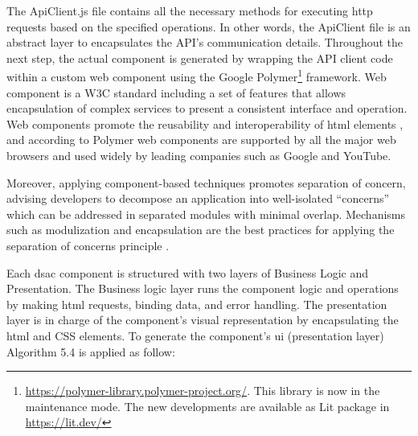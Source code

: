 The ApiClient.js file contains all the necessary methods for executing
\gls{http} requests based on the specified operations. In other words, the
ApiClient file is an abstract layer to encapsulates the API's
communication details. Throughout the next step, the actual component is
generated by wrapping the API client code within a custom web component
using the Google Polymer\footnote{\url{https://polymer-library.polymer-project.org/}.
  This library is now in the maintenance mode. The new developments are
  available as Lit package in \url{https://lit.dev/}} framework. Web
component is a W3C standard including a set of features that allows
encapsulation of complex services to present a consistent interface and
operation. Web components promote the reusability and interoperability
of \gls{html} elements \autocite{Yang2002a}, and according to \autocite{Rojas2021} Polymer web components are supported by all the major web browsers
and used widely by leading companies such as Google and YouTube.

Moreover, applying component-based techniques promotes separation of
concern, advising developers to decompose an application into
well-isolated ``concerns'' which can be addressed in separated modules
with minimal overlap. Mechanisms such as modulization and encapsulation
are the best practices for applying the separation of concerns principle
\autocite{Piessens2002}.

Each \gls{dsac} component is structured with two layers of Business Logic and
Presentation. The Business logic layer runs the component logic and
operations by making \gls{html} requests, binding data, and error handling.
The presentation layer is in charge of the component's visual
representation by encapsulating the \gls{html} and CSS elements. To generate
the component's \gls{ui} (presentation layer) Algorithm 5.4 is applied as follow:

